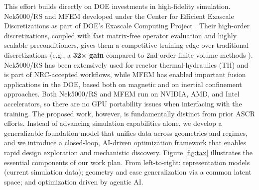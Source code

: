 This effort builds directly on DOE investments in high-fidelity simulation.
Nek5000/RS and MFEM developed under the Center for Efficient Exascale
Discretizations as part of DOE's Exascale Computing Project \cite{ceed}.  
Their high-order
discretizations, coupled with fast matrix-free operator evaluation and highly
scalable preconditioners, gives them a competitive training edge over
traditional discretizations (e.g., a {\bf 32$\times$ gain} compared to 2nd-order finite
volume methods \cite{Min2024Wind,Tomboulides2024ABL}).  Nek5000/RS has been
extensively used for reactor thermal-hydraulics (TH) and is part of NRC-accepted
workflows, while MFEM has enabled important fusion applications in the DOE,
based both on magnetic and on inertial confinement approaches.  
   Both Nek5000/RS and MFEM run on NVIDIA, AMD, and Intel accelerators, so there 
   are no GPU portability issues when interfacing with the training.
The proposed work, however, is fundamentally distinct from prior ASCR
efforts.  Instead of advancing
simulation capabilities alone, we develop a generalizable foundation model that
unifies data across geometries and regimes, and we introduce a closed-loop,
AI-driven optimization framework that enables rapid design exploration and
mechanistic discovery.   
   Figure \ref{fig:tax} illustrates the essential components of our work plan. 
From left-to-right: 
   representation models (current simulation data); geometry and case
   generalization via a common latent space; and 
   optimization driven by agentic AI.  



